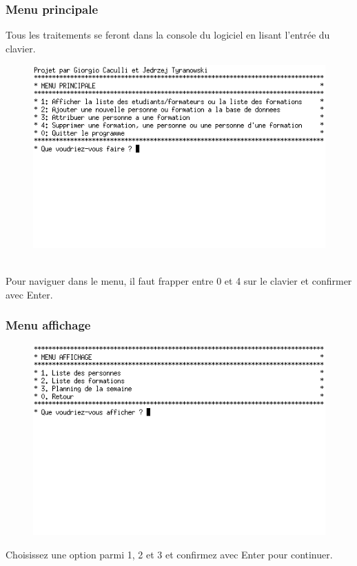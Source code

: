 \documentclass[11pt]{article}
\begin{document}
\subsubsection{Menu principale}
Tous les traitements se feront dans la console du logiciel en lisant l'entrée du clavier.
\begin{figure}[ht]
  \centering
  \includegraphics[trim=0 150 0 0, clip, scale=0.8]{images/01.png.png}
\end{figure}\\
Pour naviguer dans le menu, il faut frapper entre 0 et 4 sur le clavier et confirmer avec Enter.

\subsubsection{Menu affichage}
\begin{figure}[ht]
  \centering
  \includegraphics[trim=0 190 0 0, clip, scale=0.8]{images/02.png.png}
\end{figure}
Choisissez une option parmi 1, 2 et 3 et confirmez avec Enter pour continuer.
\end{document}
